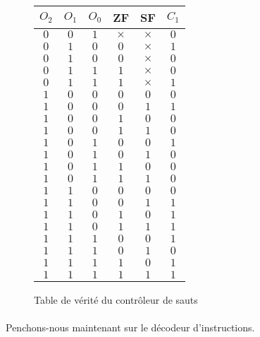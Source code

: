 \begin{figure}
	\centering
	\begin{tabular}{|c|c|c|c|c|c|}
		\hline 
		$O_{2}$ & $O_{1}$ & $O_{0}$ & ZF & SF & $C_{1}$ \\ 
		\hline 
		$0$ & $0$ & $1$ & $\times$ & $\times$ & $0$ \\ 
		\hline 
		$0$ & $1$ & $0$ & $0$ & $\times$ & $1$ \\ 
		\hline 
		$0$ & $1$ & $0$ & $0$ & $\times$ & $0$ \\ 
		\hline 
		$0$ & $1$ & $1$ & $1$ & $\times$ & $0$ \\ 
		\hline 
		$0$ & $1$ & $1$ & $1$ & $\times$ & $1$ \\ 
		\hline 
		$1$ & $0$ & $0$ & $0$ & $0$ & $0$ \\ 
		\hline 
		$1$ & $0$ & $0$ & $0$ & $1$ & $1$ \\ 
		\hline 
		$1$ & $0$ & $0$ & $1$ & $0$ & $0$ \\ 
		\hline 
		$1$ & $0$ & $0$ & $1$ & $1$ & $0$ \\ 
		\hline 
		$1$ & $0$ & $1$ & $0$ & $0$ & $1$ \\ 
		\hline 
		$1$ & $0$ & $1$ & $0$ & $1$ & $0$ \\ 
		\hline 
		$1$ & $0$ & $1$ & $1$ & $0$ & $0$ \\ 
		\hline 
		$1$ & $0$ & $1$ & $1$ & $1$ & $0$ \\ 
		\hline 
		$1$ & $1$ & $0$ & $0$ & $0$ & $0$ \\ 
		\hline 
		$1$ & $1$ & $0$ & $0$ & $1$ & $1$ \\ 
		\hline 
		$1$ & $1$ & $0$ & $1$ & $0$ & $1$ \\ 
		\hline 
		$1$ & $1$ & $0$ & $1$ & $1$ & $1$ \\ 
		\hline 
		$1$ & $1$ & $1$ & $0$ & $0$ & $1$ \\ 
		\hline 
		$1$ & $1$ & $1$ & $0$ & $1$ & $0$ \\ 
		\hline 
		$1$ & $1$ & $1$ & $1$ & $0$ & $1$ \\ 
		\hline 
		$1$ & $1$ & $1$ & $1$ & $1$ & $1$ \\ 
		\hline 
	\end{tabular} 
	\caption{
		\label{ctrl_saut_tv}
		Table de vérité du contrôleur de sauts
	}
\end{figure}

\paragraph{}{
	Penchons-nous maintenant sur le décodeur d'instructions.
}